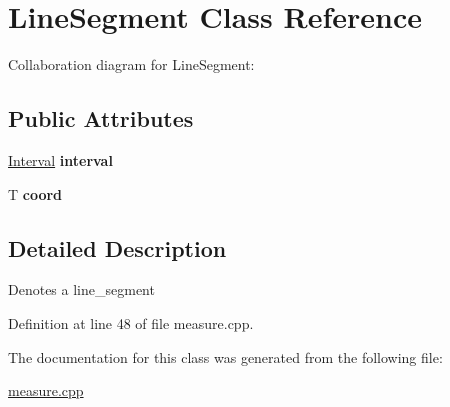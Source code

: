 \hypertarget{classLineSegment}{}\section{Line\+Segment Class Reference}
\label{classLineSegment}


Collaboration diagram for Line\+Segment\+:
\subsection*{Public Attributes}
\begin{DoxyCompactItemize}
\item 
\mbox{\label{classLineSegment_a2172ca55e87808f91d9b5832527dc82b}} 
\hyperlink{classInterval}{Interval} {\bfseries interval}
\item 
\mbox{\label{classLineSegment_abb08ceb9ae3a0e3490fe3f6268ca2d1e}} 
T {\bfseries coord}
\end{DoxyCompactItemize}


\subsection{Detailed Description}
Denotes a line\+\_\+segment 

Definition at line 48 of file measure.\+cpp.



The documentation for this class was generated from the following file\+:\begin{DoxyCompactItemize}
\item 
\hyperlink{measure_8cpp}{measure.\+cpp}\end{DoxyCompactItemize}
